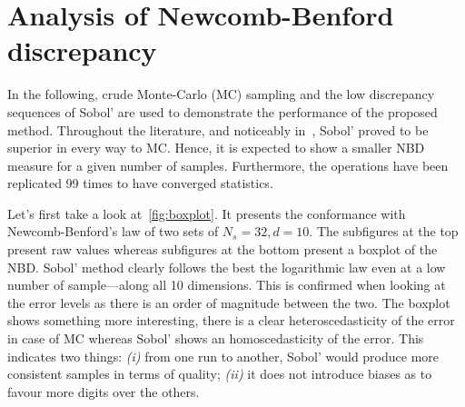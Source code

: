 \documentclass[1p,authoryear]{elsarticle}
\begin{document}
\section{Analysis of Newcomb-Benford discrepancy} \label{sec:results}

In the following, crude Monte-Carlo (MC) sampling and the low discrepancy sequences of Sobol' are used to demonstrate the performance of the proposed method. Throughout the literature, and noticeably in~\citep{Kucherenko2015}, Sobol' proved to be superior in every way to MC. Hence, it is expected to show a smaller NBD measure for a given number of samples. Furthermore, the operations have been replicated 99 times to have converged statistics.

Let's first take a look at~\cref{fig:boxplot}. It presents the conformance with Newcomb-Benford's law of two sets of $N_s=32, d=10$. The subfigures at the top present raw values whereas subfigures at the bottom present a boxplot of the NBD. Sobol' method clearly follows the best the logarithmic law even at a low number of sample---along all 10 dimensions. This is confirmed when looking at the error levels as there is an order of magnitude between the two. The boxplot shows something more interesting, there is a clear heteroscedasticity of the error in case of MC whereas Sobol' shows an homoscedasticity of the error. This indicates two things: \emph{(i)} from one run to another, Sobol' would produce more consistent samples in terms of quality; \emph{(ii)} it does not introduce biases as to favour more digits over the others.
\end{document}
